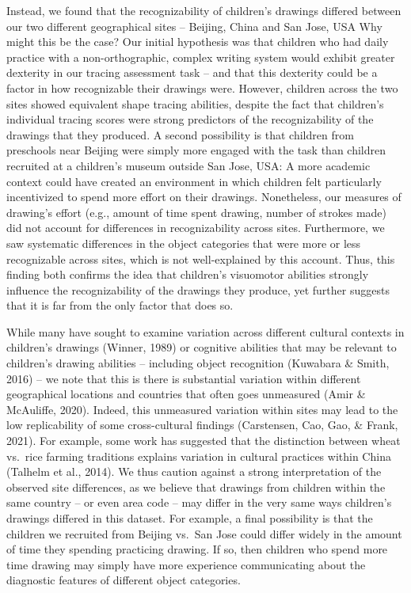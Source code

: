 \documentclass[
  english,
  man]{apa6}
\begin{document}
Instead, we found that the recognizability of children's drawings differed between our two different geographical sites -- Beijing, China and San Jose, USA Why might this be the case? Our initial hypothesis was that children who had daily practice with a non-orthographic, complex writing system would exhibit greater dexterity in our tracing assessment task -- and that this dexterity could be a factor in how recognizable their drawings were. However, children across the two sites showed equivalent shape tracing abilities, despite the fact that children's individual tracing scores were strong predictors of the recognizability of the drawings that they produced. A second possibility is that children from preschools near Beijing were simply more engaged with the task than children recruited at a children's museum outside San Jose, USA: A more academic context could have created an environment in which children felt particularly incentivized to spend more effort on their drawings. Nonetheless, our measures of drawing's effort (e.g., amount of time spent drawing, number of strokes made) did not account for differences in recognizability across sites. Furthermore, we saw systematic differences in the object categories that were more or less recognizable across sites, which is not well-explained by this account. Thus, this finding both confirms the idea that children's visuomotor abilities strongly influence the recognizability of the drawings they produce, yet further suggests that it is far from the only factor that does so.

While many have sought to examine variation across different cultural contexts in children's drawings (Winner, 1989) or cognitive abilities that may be relevant to children's drawing abilities -- including object recognition (Kuwabara \& Smith, 2016) -- we note that this is there is substantial variation within different geographical locations and countries that often goes unmeasured (Amir \& McAuliffe, 2020). Indeed, this unmeasured variation within sites may lead to the low replicability of some cross-cultural findings (Carstensen, Cao, Gao, \& Frank, 2021). For example, some work has suggested that the distinction between wheat vs.~rice farming traditions explains variation in cultural practices within China (Talhelm et al., 2014). We thus caution against a strong interpretation of the observed site differences, as we believe that drawings from children within the same country -- or even area code -- may differ in the very same ways children's drawings differed in this dataset. For example, a final possibility is that the children we recruited from Beijing vs.~San Jose could differ widely in the amount of time they spending practicing drawing. If so, then children who spend more time drawing may simply have more experience communicating about the diagnostic features of different object categories.
\end{document}
